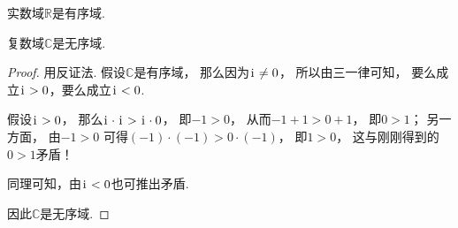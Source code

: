 \begin{theorem}
实数域\(\mathbb{R}\)是有序域.
\end{theorem}

\begin{theorem}
复数域\(\mathbb{C}\)是无序域.
\begin{proof}
用反证法.
假设\(\mathbb{C}\)是有序域，
那么因为\(\kern1pt\mathrm{i}\kern1pt\neq0\)，
所以由三一律可知，
要么成立\(\kern1pt\mathrm{i}\kern1pt>0\)，要么成立\(\kern1pt\mathrm{i}\kern1pt<0\).

假设\(\kern1pt\mathrm{i}\kern1pt>0\)，
那么\(\kern1pt\mathrm{i}\kern1pt\cdot\kern1pt\mathrm{i}\kern1pt>\kern1pt\mathrm{i}\kern1pt\cdot0\)，
即\(-1>0\)，
从而\(-1+1>0+1\)，
即\(0>1\)；
另一方面，
由\(-1>0\)
可得\((-1)\cdot(-1)>0\cdot(-1)\)，
即\(1>0\)，
这与刚刚得到的\(0>1\)矛盾！

同理可知，由\(\kern1pt\mathrm{i}\kern1pt<0\)也可推出矛盾.

因此\(\mathbb{C}\)是无序域.
\end{proof}
\end{theorem}
